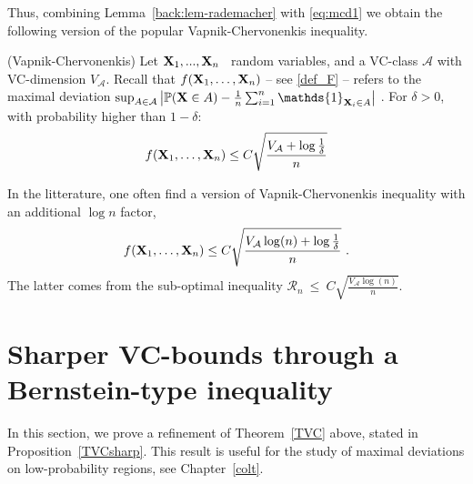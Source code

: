 Thus, combining Lemma~\ref{back:lem-rademacher} with \eqref{eq:mcd1} we obtain the following version of the popular Vapnik-Chervonenkis inequality.
\begin{theorem}{\sc (Vapnik-Chervonenkis)}
\label{TVC}
Let $\mathbf X_1,...,\mathbf X_n$ \iid~random variables, and a VC-class $\mathcal{A}$ with VC-dimension $V_{\mathcal{A}}$. 
Recall that $f(\mathbf X_1,\ldots,\mathbf X_n)$ -- see \eqref{def_F} -- refers to the maximal deviation $\sup_{A \in \mathcal{A}} \left | \mathbb{P}(\mb X \in A) - \frac{1}{n} \sum_{i=1}^n \mathds{1}_{\mb X_i \in A} \right|~$. For $\delta>0$, with probability higher than $1-\delta$:
\begin{align*}
f(\mb X_1,\ldots,\mb X_n) \le C \sqrt{\frac{V_{\mathcal{A}} + \log{\frac{1}{\delta}}}{n}} %
\end{align*}
\end{theorem}
In the litterature, one often find a version of Vapnik-Chervonenkis inequality with an additional $\log n$ factor,
\begin{align*}
f(\mb X_1,\ldots,\mb X_n) \le C \sqrt{\frac{V_{\mathcal{A}}\log(n) + \log{\frac{1}{\delta}}}{n}}~. %
\end{align*}
The latter comes %
from the sub-optimal inequality $\mathcal{R}_n ~\le~ C \sqrt{\frac{V_{\mathcal{A}}\log(n)}{n}}$.%

\section{Sharper VC-bounds through a Bernstein-type inequality}
\label{sec:concentration-contrib}

In this section, we prove a refinement of Theorem~\ref{TVC} above, stated in Proposition~\ref{TVCsharp}. This result is useful for the study of maximal deviations on low-probability regions, see Chapter~\ref{colt}.

